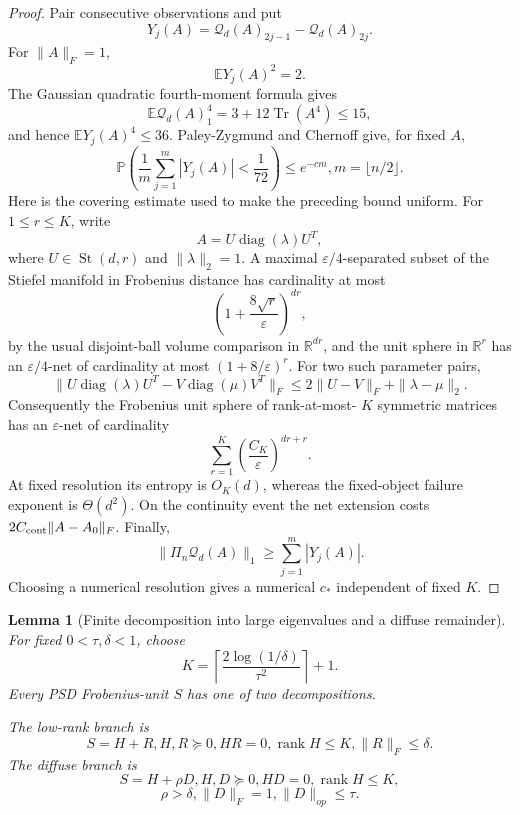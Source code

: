 \documentclass[11pt]{article}
\numberwithin{equation}{section}
\newtheorem{lemma}[theorem]{Lemma}
\theoremstyle{definition}
\theoremstyle{remark}
\newcommand{\E}{\mathbb E}
\newcommand{\Pp}{\mathbb P}
\newcommand{\1}{\boldsymbol 1}
\newcommand{\PiZero}{\Pi_n}
\begin{document}
\begin{aiblock}
\begin{proof}
  Pair consecutive observations and put
  \[
    Y_j(A)=\mathcal{Q}_d(A)_{2j-1}-\mathcal{Q}_d(A)_{2j}.
  \]
  For $\|A\|_F=1$,
  \[
    \E Y_j(A)^2=2.
  \]
  The Gaussian quadratic fourth-moment formula gives
  \[
    \E\mathcal{Q}_d(A)_1^4=3+12\operatorname{Tr}(A^4)
    \le15,
  \]
  and hence $\E Y_j(A)^4\le36$. Paley-Zygmund and Chernoff
  give, for fixed $A$,
  \[
    \Pp\left(\frac1m\sum_{j=1}^m|Y_j(A)|<\frac1{72}\right)
    \le e^{-cm}, m=\lfloor n/2\rfloor.
  \]
  Here is the covering estimate used to make the preceding
  bound uniform. For $1\le r\le K$, write
  \[
    A=U\operatorname{diag}(\lambda)U^T,
  \]
  where $U\in\operatorname{St}(d,r)$ and
  $\|\lambda\|_2=1$. A maximal $\varepsilon/4$-separated
  subset of the Stiefel manifold in Frobenius distance has
  cardinality at most
  \[
    \left(1+\frac{8\sqrt r}{\varepsilon}\right)^{dr},
  \]
  by the usual disjoint-ball volume comparison in
  $\mathbb R^{dr}$, and the unit sphere in $\mathbb R^r$
  has an $\varepsilon/4$-net of cardinality at most
  $(1+8/\varepsilon)^r$. For two such parameter pairs,
  \[
    \|U\operatorname{diag}(\lambda)U^T
    -V\operatorname{diag}(\mu)V^T\|_F \le2\|U-V\|_F+
    \|\lambda-\mu\|_2.
  \]
  Consequently the Frobenius unit sphere of rank-at-most-
  $K$ symmetric matrices has an $\varepsilon$-net of
  cardinality
  \[
    \sum_{r=1}^K\left(\frac{C_K}{\varepsilon}\right)^{dr+r}.
  \]
  At fixed resolution its entropy is $O_K(d)$, whereas the
  fixed-object failure exponent is $\Theta(d^2)$. On the
  continuity event the net extension costs $2C_{\rm cont}
  \|A-A_0\|_F$. Finally,
  \[
    \|\PiZero\mathcal{Q}_d(A)\|_1\ge\sum_{j=1}^m|Y_j(A)|.
  \]
  Choosing a numerical resolution gives a numerical $c_*$
  independent of fixed $K$.
\end{proof}

\begin{lemma}[Finite decomposition into large eigenvalues
  and a diffuse
  remainder]\label{main-lemma-11-2}
  For fixed $0<\tau,\delta<1$, choose
  \[
    K=\left\lceil\frac{2\log(1/\delta)}{\tau^2}\right\rceil+1.
  \]
  Every PSD Frobenius-unit $S$ has one of two
  decompositions.

  The low-rank branch is
  \[
    S=H+R, H,R\succeq0, HR=0, \operatorname{rank}H\le K,
    \|R\|_F\le\delta.
  \]
  The diffuse branch is
  \[
    S=H+\rho D, H,D\succeq0, HD=0, \operatorname{rank}H\le
    K,
  \]
  \[
    \rho>\delta, \|D\|_F=1, \|D\|_{op}\le\tau.
  \]
\end{lemma}


\end{aiblock}
\end{document}
